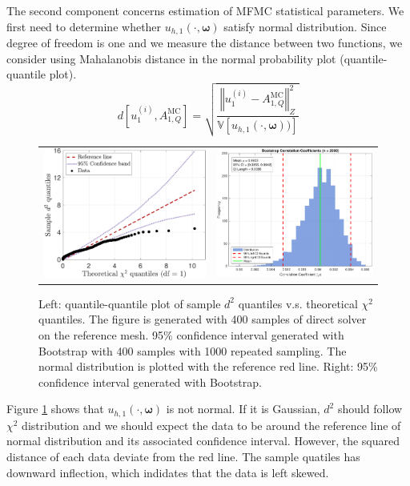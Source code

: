 The second component concerns estimation of MFMC statistical parameters. We first need to determine whether $u_{h,1}(\cdot, \boldsymbol{\omega})$ satisfy normal distribution. Since degree of freedom is one and we measure the distance between two functions, we consider using Mahalanobis distance \cite{Ma:2018} in the normal probability plot (quantile-quantile plot).
\[
d\left[u_{1}^{(i)}, A_{1,Q}^{\text{MC}}\right] = \sqrt{\frac{\left\Vert u_{1}^{(i)} - A_{1,Q}^{\text{MC}}\right\Vert_Z^2}{\mathbb{V}\left[u_{h,1}(\cdot, \boldsymbol{\omega}))\right]}}
\]

%
\begin{figure}[ht!]\centering
\begin{tabular}{cc}
\includegraphics[height=0.36\linewidth]{./figures/test_normal.pdf}&
\includegraphics[height=0.36\linewidth]{./figures/CI_bootstrap.pdf}
\end{tabular}
\caption{Left: quantile-quantile plot of sample $d^2$ quantiles v.s. theoretical $\chi^2$ quantiles. The figure is generated with 400 samples of direct solver on the reference mesh. 95\% confidence interval generated with Bootstrap with 400 samples with 1000 repeated sampling. The normal distribution is plotted with the reference red line. Right: 95\% confidence interval generated with Bootstrap.}
\label{fig:Test_normal}
\end{figure}
%
Figure \ref{fig:Test_normal} shows that $u_{h,1}(\cdot, \boldsymbol{\omega})$ is not normal. If it is Gaussian, $d^2$ should follow $\chi^2$ distribution and we should expect the data to be around the reference line of normal distribution and its associated confidence interval. However, the squared distance of each data deviate from the red line. The sample quatiles has downward inflection, which indidates that the data is left skewed.

